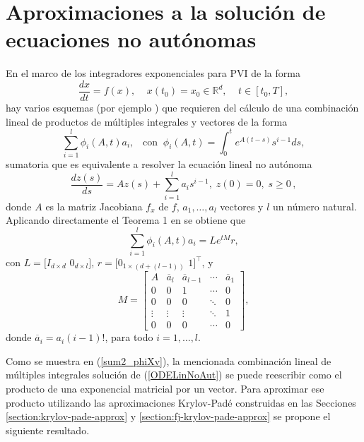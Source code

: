 \section{Aproximaciones a la solución de ecuaciones no autónomas}\label{section:approx-non-auto}
En el marco de los integradores exponenciales para PVI de la forma
\begin{equation*}
	\frac{dx}{dt}=f(x),  \;\;\;\; x(t_0)=x_0 \in \mathbb{R}^{d},   \;\;\;\; t\in[t_0,T],
\end{equation*}
hay varios esquemas (por ejemplo \cite{tokman2006efficient,delaCruz07,hochbruck2011exponential}) que requieren del cálculo de una combinación lineal de productos de múltiples integrales y vectores de la forma
\begin{equation*}
	\sum\limits_{i=1}^{l}\phi _{i}(A,t)a_{i},   \;\;\;\mathrm{con} \;\; \phi _{i}(A,t)=\int_{0}^{t}e^{A(t-s)}s^{i-1}ds,
\end{equation*}
sumatoria que es equivalente a resolver la ecuación lineal no autónoma \cite{skaflestad2009scaling}
\begin{equation}\label{ODELinNoAut}
	\frac{dz(s)}{ds} = Az(s)+\sum\limits_{i=1}^{l}a_is^{i-1},\;z(0)=0,\;s\geq 0\, ,
\end{equation}
donde $A$ es la matriz Jacobiana $f_x$ de $f$, $a_1,\ldots,a_l$ vectores y $l$ un número natural. 
Aplicando directamente el Teorema 1 en \cite{carbonell2008computing} se obtiene que \cite{carbonell2008computing,jimenez2006local}
\begin{equation}\label{sum2_phiXv}
\sum\limits_{i=1}^{l}\phi _{i}(A,t)a_{i} = L e^{t M}r,
\end{equation}
con $L=[I_{d\times d}$ $0_{d\times l}]$, $r=[0_{1\times (d+(l-1))}$ $1]^{\intercal }$, y
\begin{equation*}
M=\left[
\begin{array}{ccccc}
A & \overline{a}_{l} & \overline{a}_{l-1} & \cdots & \overline{a}_{1} \\ 
0 & 0 & 1 & \cdots & 0 \\
0 & 0 & 0 & \ddots & 0 \\
\vdots & \vdots & \vdots & \ddots & 1 \\
0 & 0 & 0 & \cdots & 0
\end{array}%
\right],  \label{matrixH2}
\end{equation*}%
donde $\overline{a}_{i}=a_{i}(i-1)!$, para todo $i=1,\ldots ,l$.

Como se muestra en (\ref{sum2_phiXv}), la mencionada combinación lineal de múltiples integrales solución de (\ref{ODELinNoAut}) se puede reescribir como el producto de una exponencial matricial por un vector. Para aproximar ese producto utilizando las aproximaciones Krylov-Padé construidas en las Secciones \ref{section:krylov-pade-approx} y \ref{section:fj-krylov-pade-approx} se propone el siguiente resultado.

